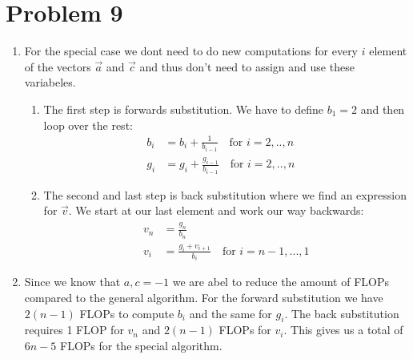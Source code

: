 \documentclass[english,notitlepage]{revtex4-1}  %
\begin{document}
\section*{Problem 9}
\begin{enumerate}[label= \alph*)]
  \item For the special case we dont need to do new computations for every $i$ element of the vectors $\vec{a}$ and $\vec{c}$ and thus don't need to assign and use these variabeles.
  \begin{enumerate}[label=\roman*)]
    \item The first step is forwards substitution. We have to define $b_1 = 2$ and then loop over the rest:
    \begin{align*}
      b_i &= b_i + \frac{1}{b_{i-1}} \quad  \text{for }i=2,..,n \quad\\
      g_i &= g_i + \frac{g_{i-1}}{b_{i-1}} \quad  \text{for } i = 2,..,n \quad
    \end{align*}
    \item The second and last step is back substitution where we find an expression for $\vec{v}$. We start at our last element and work our way backwards:
    \begin{align*}
      v_n &= \frac{g_n}{b_n} \\
      v_i &= \frac{g_i + v_{i+1}}{b_i} \quad \text{for } i = n-1,...,1
    \end{align*}
  \end{enumerate}
  \item Since we know that $a,c = -1$ we are abel to reduce the amount of FLOPs compared to the general algorithm. For the forward substitution we have $2(n-1)$ FLOPs to compute $b_i$ and the same for $g_i$. The back substitution requires 1 FLOP for $v_n$ and $2(n-1)$ FLOPs for $v_i$. This gives us a total of $6n-5$ FLOPs for the special algorithm.
\end{enumerate}
\end{document}
